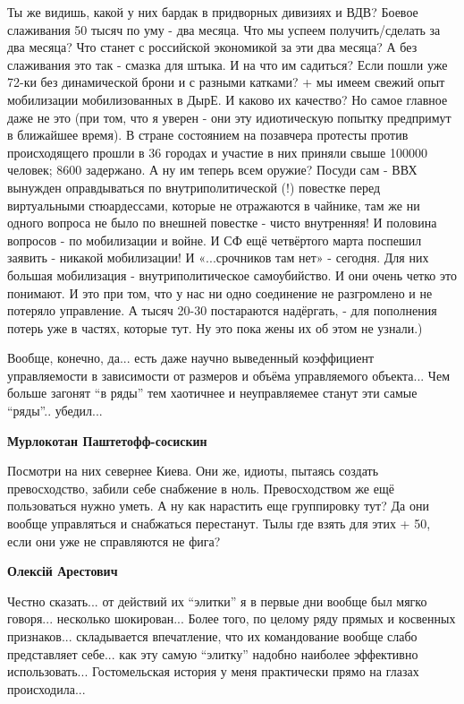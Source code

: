 \begin{itemize}
\begin{itemize}
\obeycr
Ты же видишь, какой у них бардак в придворных дивизиях и ВДВ?
Боевое слаживания 50 тысяч по уму - два месяца.
Что мы успеем получить/сделать за два месяца?
Что станет с российской экономикой за эти два месяца?
А без слаживания это так - смазка для штыка.
И на что им садиться?
Если пошли уже 72-ки без динамической брони и с разными катками?
+ мы имеем свежий опыт мобилизации мобилизованных в ДырЕ.
И каково их качество?
Но самое главное даже не это (при том, что я уверен - они эту идиотическую попытку предпримут в ближайшее время).
В стране состоянием на позавчера протесты против происходящего прошли в 36 городах и участие в них приняли свыше 100000 человек; 8600 задержано.
А ну им теперь всем оружие?
Посуди сам - ВВХ вынужден оправдываться по внутриполитической (!) повестке перед виртуальными стюардессами, которые не отражаются в чайнике, там же ни одного вопроса не было по внешней повестке - чисто внутренняя!
И половина вопросов - по мобилизации и войне.
И СФ ещё четвёртого марта поспешил заявить - никакой мобилизации!
И «...срочников там нет» - сегодня.
Для них большая мобилизация - внутриполитическое самоубийство. И они очень четко это понимают.
И это при том, что у нас ни одно соединение не разгромлено и не потеряло управление.
А тысяч 20-30 постараются надёргать, - для пополнения потерь уже в частях, которые тут.
Ну это пока жены их об этом не узнали.)
\restorecr


Вообще, конечно, да... есть даже научно выведенный коэффициент управляемости в
зависимости от размеров и объёма управляемого объекта... Чем больше загонят
\enquote{в ряды} тем хаотичнее и неуправляемее станут эти самые
\enquote{ряды}.. убедил...

\textbf{Мурлокотан Паштетофф-сосискин}

\obeycr
Посмотри на них севернее Киева.
Они же, идиоты, пытаясь создать превосходство, забили себе снабжение в ноль.
Превосходством же ещё пользоваться нужно уметь.
А ну как нарастить еще группировку тут?
Да они вообще управляться и снабжаться перестанут.
Тылы где взять для этих + 50, если они уже не справляются не фига?
\restorecr

\textbf{Олексій Арестович} 

Честно сказать... от действий их \enquote{элитки} я в первые дни вообще был мягко
говоря... несколько шокирован... Более того, по целому ряду прямых и косвенных
признаков... складывается впечатление, что их командование вообще слабо
представляет себе... как эту самую \enquote{элитку} надобно наиболее эффективно
использовать... Гостомельская история у меня практически прямо на глазах
происходила...


\end{itemize}
\end{itemize}
